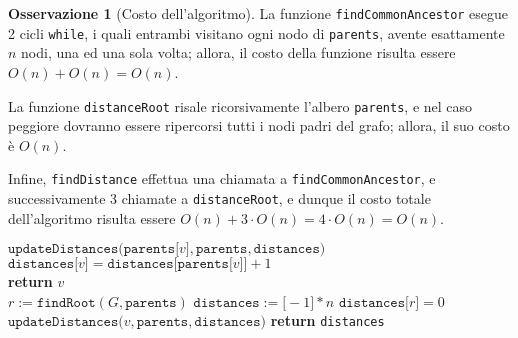 \documentclass[14pt]{extreport}
\theoremstyle{definition}
\theoremstyle{definition}
\newtheorem{remark}{Osservazione}[subsection]
\begin{document}
\begin{remark}[Costo dell'algoritmo]
    La funzione \texttt{findCommonAncestor} esegue 2 cicli \texttt{while}, i quali entrambi visitano ogni nodo di \texttt{parents}, avente esattamente $n$ nodi, una ed una sola volta; allora, il costo della funzione risulta essere $O(n) + O(n) = O(n)$.

    La funzione \texttt{distanceRoot} risale ricorsivamente l'albero \texttt{parents}, e nel caso peggiore dovranno essere ripercorsi tutti i nodi padri del grafo; allora, il suo costo è $O(n)$.

    Infine, \texttt{findDistance} effettua una chiamata a \texttt{findCommonAncestor}, e successivamente 3 chiamate a \texttt{distanceRoot}, e dunque il costo totale dell'algoritmo risulta essere $O(n) + 3 \cdot O(n) = 4 \cdot O(n) = O(n)$.
\end{remark}

\begin{algorithm}[H]
    \caption{
        Dato un grafo $G$, rappresentato attraverso liste di adiacenza, e un vettore di padri di un albero/arborescenza di visita in DFS di $G$, l'algoritmo restituisce la distanza di ogni vertice dalla radice dell'albero/arborescenza.\\
        \textbf{Input}: $G$ grafo diretto, rappresentato attraverso liste di adiacenza; \texttt{parents} un array di padri di un albero/arborescenza radicato in un certo $r \in V(G)$.\\
        \textbf{Output}: $\forall v \in V(G) \quad \mathrm{dist}(r, v)$.
    }

    \begin{algorithmic}[1]
             
                \State $\texttt{updateDistances(parents[}v\texttt{]}, \texttt{parents}, \texttt{distances)}$
            \EndIf
            \State $\texttt{distances[}v\texttt{]} = \texttt{distances[parents[}v\texttt{]]} + 1$
        \EndFunction
        \\
                    \State \textbf{return} $v$
                \EndIf
            \EndFor
        \EndFunction
        \\
            \State $r := \texttt{findRoot}(G, \texttt{parents})$
            \State $\texttt{distances}:=\texttt{[}-1\texttt{]} * n$
            \State $\texttt{distances[}r\texttt{]} = 0$
                 
                    \State $\texttt{updateDistances(}v, \texttt{parents}, \texttt{distances)}$
                \EndIf
            \EndFor
            \State \textbf{return} \texttt{distances}
        \EndFunction
    \end{algorithmic}
\end{algorithm}
\end{document}
